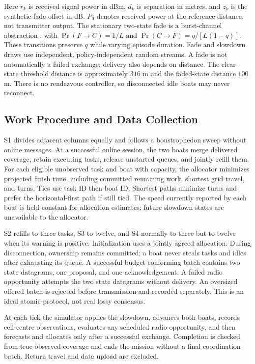 Here $r_k$ is received signal power in dBm, $d_k$ is separation in metres, and $z_k$ is the synthetic fade offset in dB. $P_0$ denotes received power at the reference distance, not transmitter output. The stationary two-state fade is a burst-channel abstraction \cite{gilbert1960burst}, with $\Pr(F\to C)=1/L$ and $\Pr(C\to F)=q/[L(1-q)]$. These transitions preserve $q$ while varying episode duration. Fade and slowdown draws use independent, policy-independent random streams. A fade is not automatically a failed exchange; delivery also depends on distance. The clear-state threshold distance is approximately $316$ m and the faded-state distance $100$ m. There is no rendezvous controller, so disconnected idle boats may never reconnect.

\subsection{Work Procedure and Data Collection}
S1 divides adjacent columns equally and follows a boustrophedon sweep without online messages. At a successful online session, the two boats merge delivered coverage, retain executing tasks, release unstarted queues, and jointly refill them. For each eligible unobserved task and boat with capacity, the allocator minimizes projected finish time, including committed remaining work, shortest grid travel, and turns. Ties use task ID then boat ID. Shortest paths minimize turns and prefer the horizontal-first path if still tied. The speed currently reported by each boat is held constant for allocation estimates; future slowdown states are unavailable to the allocator.

S2 refills to three tasks, S3 to twelve, and S4 normally to three but to twelve when its warning is positive. Initialization uses a jointly agreed allocation. During disconnection, ownership remains committed; a boat never steals tasks and idles after exhausting its queue. A successful budget-conforming batch contains two state datagrams, one proposal, and one acknowledgement. A failed radio opportunity attempts the two state datagrams without delivery. An oversized offered batch is rejected before transmission and recorded separately. This is an ideal atomic protocol, not real lossy consensus.

At each tick the simulator applies the slowdown, advances both boats, records cell-centre observations, evaluates any scheduled radio opportunity, and then forecasts and allocates only after a successful exchange. Completion is checked from true observed coverage and ends the mission without a final coordination batch. Return travel and data upload are excluded.

